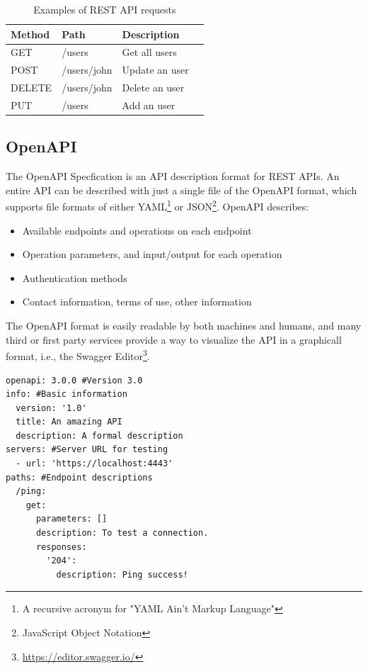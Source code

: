 \begin{table}[hbt]
\centering
\caption{Examples of REST API requests}
\label{restapiex}
\begin{tabular}{|l|l|l|l|}
\hline
\textbf{Method} & \textbf{Path} & \textbf{Description} \\ \hline
 GET & /users & Get all users \\ \hline
 POST & /users/john & Update an user  \\ \hline
 DELETE & /users/john &  Delete an user \\ \hline
 PUT & /users & Add an user \\ \hline
\end{tabular}
\end{table} 

\subsection*{OpenAPI}
The OpenAPI Specfication is an API description format for REST APIs. An entire API can be described with just a single file of the OpenAPI format, which supports file formats of either YAML\footnote{A recursive acronym for "YAML Ain't Markup Language"} or JSON\footnote{JavaScript Object Notation}. OpenAPI describes:

\begin{itemize}
    \item Available endpoints and operations on each endpoint
    \item Operation parameters, and input/output for each operation
    \item Authentication methods
    \item Contact information, terms of use, other information
\end{itemize}

The OpenAPI format is easily readable by both machines and humans, and many third or first party services provide a way to visualize the API in a graphicall format, i.e., the Swagger Editor\footnote{\url{https://editor.swagger.io/}}.\cite{SwaggerDocs}


\begin{lstlisting}[caption={An example of an OpenAPI file in the YAML format}, label=openapiex]
openapi: 3.0.0 #Version 3.0
info: #Basic information
  version: '1.0' 
  title: An amazing API
  description: A formal description
servers: #Server URL for testing
  - url: 'https://localhost:4443'
paths: #Endpoint descriptions
  /ping:
    get:
      parameters: [] 
      description: To test a connection.
      responses:
        '204':
          description: Ping success!
\end{lstlisting}

